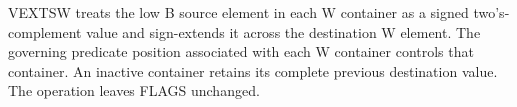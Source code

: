 VEXTSW treats the low B source element in each W container as a signed
two's-complement value and sign-extends it across the destination W element.
The governing predicate position associated with each W container controls
that container.  An inactive container retains its complete previous
destination value.  The operation leaves FLAGS unchanged.
